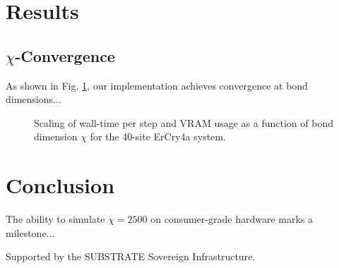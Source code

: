 \documentclass[reprint,aps,prb,superscriptaddress]{revtex4-2}
\begin{document}
\section{Results}
\subsection{$\chi$-Convergence}
As shown in Fig. \ref{fig:scaling}, our implementation achieves convergence at bond dimensions...

\begin{figure}[t]
    \centering
    \caption{Scaling of wall-time per step and VRAM usage as a function of bond dimension $\chi$ for the 40-site ErCry4a system.}
    \label{fig:scaling}
\end{figure}

\section{Conclusion}
The ability to simulate $\chi=2500$ on consumer-grade hardware marks a milestone...

\begin{acknowledgments}
Supported by the SUBSTRATE Sovereign Infrastructure.
\end{acknowledgments}


\end{document}
